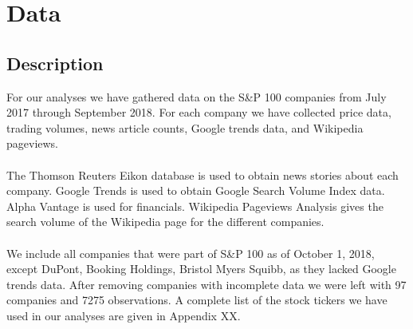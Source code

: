 
\chapter{Data}


\section{Description}
For our analyses we have gathered data on the  S\&P 100 companies from July 2017 through September 2018. For each company we have collected price data, trading volumes, news article counts, Google trends data, and Wikipedia pageviews.  
\\\\
The Thomson Reuters Eikon database is used to obtain news stories about each company. Google Trends is used to obtain Google Search Volume Index data. Alpha Vantage is used for financials. Wikipedia Pageviews Analysis gives the search volume of the Wikipedia page for the different companies. 
\\\\
We include all companies that were part of S\&P 100 as of October 1, 2018, except DuPont, Booking Holdings, Bristol Myers Squibb, as they lacked Google trends data. After removing companies with incomplete data we were left with 97 companies and 7275 observations. A complete list of the stock tickers we have used in our analyses are given in Appendix XX.


